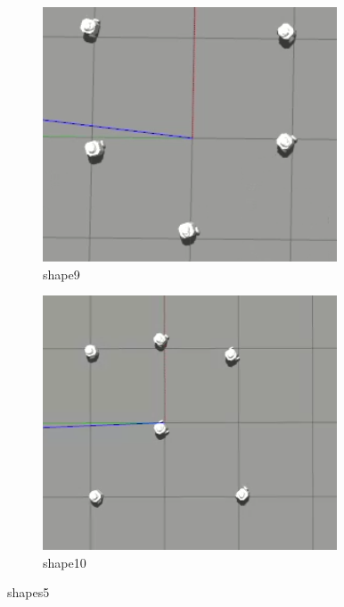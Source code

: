 \documentclass[12pt]{extarticle}
\begin{document}
\begin{figure}
\centering
\begin{subfigure}{.5\textwidth}
  \centering
  \includegraphics[width=.8\linewidth]{shape9}
  \caption{shape9}
  \label{fig:sub1}
\end{subfigure}%
\begin{subfigure}{.5\textwidth}
  \centering
  \includegraphics[width=.8\linewidth]{shape10}
  \caption{shape10}
  \label{fig:sub2}
\end{subfigure}
\caption{shapes5}
\label{fig:test}



\end{figure}
\end{document}

